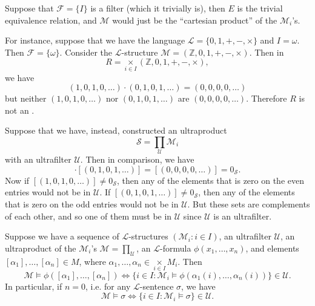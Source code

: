 \documentclass[notoc,notitlepage]{tufte-book}
\begin{document}
\begin{eg}
  Suppose that $\mathcal{F} = \{ I \}$ is a filter (which it trivially is), then $E$ is the trivial equivalence relation, and $\mathcal{M}$ would just be the ``cartesian product'' of the $\mathcal{M}_i$'s.

  For instance, suppose that we have the language $\mathcal{L} = \{ 0, 1, +, -, \times \}$ and $I = \omega$. Then $\mathcal{F} = \{ \omega \}$. Consider the $\mathcal{L}$-structure $\mathcal{M} = ( \mathbb{Z}, 0, 1, +, -, \times )$. Then in
  \begin{equation*}
    R = \underset{i \in I}{\times} ( \mathbb{Z}, 0, 1, +, -, \times ),
  \end{equation*}
  we have
  \begin{equation*}
    (1, 0, 1, 0, \ldots) \cdot ( 0, 1, 0, 1, \ldots ) = ( 0, 0, 0, 0, \ldots )
  \end{equation*}
  but neither $(1, 0, 1, 0, \ldots)$ nor $(0, 1, 0, 1, \ldots)$ are $(0, 0, 0, 0, \ldots)$. Therefore $R$ is not an .

  Suppose that we have, instead, constructed an ultraproduct
  \begin{equation*}
    \mathcal{S} = \prod_{\mathcal{U}} \mathcal{M}_i
  \end{equation*}
  with an ultrafilter $\mathcal{U}$. Then in comparison, we have
  \begin{equation*}
    [(1, 0, 1, 0, \ldots)] \cdot [(0, 1, 0, 1, \ldots)] = [(0, 0, 0, 0, \ldots)] = 0_\mathcal{S}.
  \end{equation*}
  Now if $[(1, 0, 1, 0, \ldots)] \neq 0_\mathcal{S}$, then any of the elements that is zero on the even entries would not be in $\mathcal{U}$. If $[(0, 1, 0, 1, \ldots)] \neq 0_{\mathcal{S}}$, then any of the elements that is zero on the odd entries would not be in $\mathcal{U}$. But these sets are complements of each other, and so one of them must be in $\mathcal{U}$ since $\mathcal{U}$ is an ultrafilter.
\end{eg}

\begin{thm}[{\L}o\'{s}]\label{thm:los}
  Suppose we have a sequence of $\mathcal{L}$-structures $(\mathcal{M}_i : i \in I)$, an ultrafilter $\mathcal{U}$, an ultraproduct of the $\mathcal{M}_i$'s $\mathcal{M} = \prod_{\mathcal{U}}$, an $\mathcal{L}$-formula $\phi(x_1, \ldots, x_n)$, and elements $[\alpha_1], \ldots, [\alpha_n] \in M$, where $\alpha_1, \ldots, \alpha_n \in \underset{i \in I}{\times} M_i$. Then
  \begin{equation*}
    \mathcal{M} \models \phi([\alpha_1], \ldots, [\alpha_n]) \iff \{ i \in I : \mathcal{M}_i \models \phi( \alpha_1(i), \ldots, \alpha_n(i) ) \} \in \mathcal{U}.
  \end{equation*}
  In particular, if $n = 0$, i.e. for any $\mathcal{L}$-sentence $\sigma$, we have
  \begin{equation*}
    \mathcal{M} \models \sigma \iff \{ i \in I : \mathcal{M}_i \models \sigma \} \in \mathcal{U}.
  \end{equation*}
\end{thm}
\end{document}

